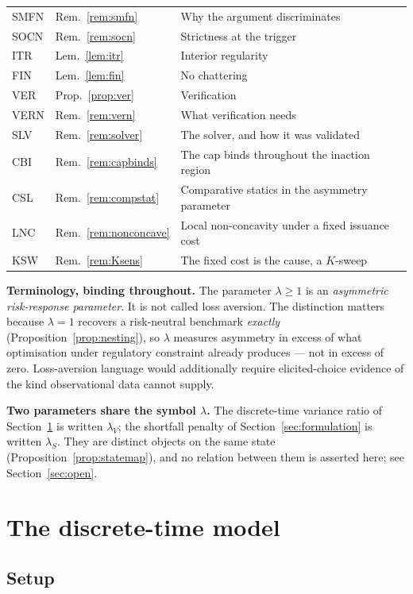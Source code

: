 \documentclass[11pt]{article}
\theoremstyle{remark}
\begin{document}
\begin{longtable}{lll}
SMFN & Rem.~\ref{rem:smfn} & Why the argument discriminates \\
SOCN & Rem.~\ref{rem:socn} & Strictness at the trigger \\
ITR & Lem.~\ref{lem:itr} & Interior regularity \\
FIN & Lem.~\ref{lem:fin} & No chattering \\
VER & Prop.~\ref{prop:ver} & Verification \\
VERN & Rem.~\ref{rem:vern} & What verification needs \\
SLV & Rem.~\ref{rem:solver} & The solver, and how it was validated \\
CBI & Rem.~\ref{rem:capbinds} & The cap binds throughout the inaction region \\
CSL & Rem.~\ref{rem:compstat} & Comparative statics in the asymmetry parameter \\
LNC & Rem.~\ref{rem:nonconcave} & Local non-concavity under a fixed issuance cost \\
KSW & Rem.~\ref{rem:Ksens} & The fixed cost is the cause, a $K$-sweep \\
\bottomrule
\end{longtable}


\bigskip
\noindent\textbf{Terminology, binding throughout.} The parameter
$\lambda \ge 1$ is an \emph{asymmetric risk-response parameter}. It is not
called loss aversion. The distinction matters because $\lambda = 1$ recovers
a risk-neutral benchmark \emph{exactly} (Proposition~\ref{prop:nesting}), so
$\lambda$ measures asymmetry in excess of what optimisation under regulatory
constraint already produces --- not in excess of zero. Loss-aversion
language would additionally require elicited-choice evidence of the kind
observational data cannot supply.

\medskip
\noindent\textbf{Two parameters share the symbol $\lambda$.} The
discrete-time variance ratio of Section~\ref{sec:discrete} is written
$\lambda_V$; the shortfall penalty of Section~\ref{sec:formulation} is
written $\lambda_S$. They are distinct objects on the same state
(Proposition~\ref{prop:statemap}), and no relation between them is
asserted here; see Section~\ref{sec:open}.

\section{The discrete-time model}
\label{sec:discrete}

\subsection{Setup}
\end{document}
